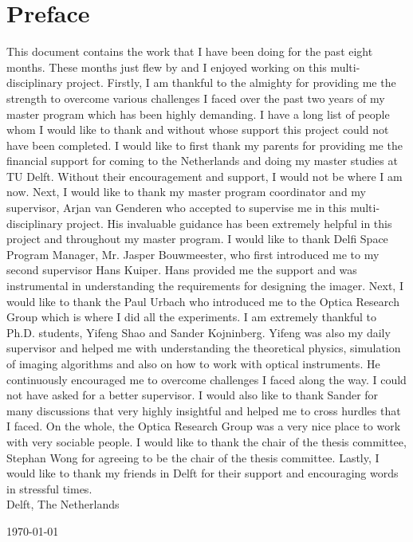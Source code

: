 \chapter*{Preface}
This document contains the work that I have been doing for the past eight months. These months just flew by and I enjoyed working on this multi-disciplinary project. Firstly, I am thankful to the almighty for providing me the strength to overcome various challenges I faced over the past two years of my master program which has been highly demanding. I have a long list of people whom I would like to thank and without whose support this project could not have been completed.
I would like to first thank my parents for providing me the financial support for coming to the Netherlands and doing my master studies at TU Delft. Without their encouragement and support, I would not be where I am now. Next, I would like to thank my master program coordinator and my supervisor, Arjan van Genderen who accepted to supervise me in this multi-disciplinary project. His invaluable guidance has been extremely helpful in this project and throughout my master program. 
I would like to thank Delfi Space Program Manager, Mr. Jasper Bouwmeester, who first introduced me to my second supervisor Hans Kuiper. Hans provided me the support and was instrumental in understanding the requirements for designing the imager. Next, I would like to thank the Paul Urbach who introduced me to the Optica Research Group which is where I did all the experiments. I am extremely thankful to Ph.D. students, Yifeng Shao and Sander Kojninberg. Yifeng was also my daily supervisor and helped me with understanding the theoretical physics, simulation of imaging algorithms and also on how to work with optical instruments. He continuously encouraged me to overcome challenges I faced along the way. I could not have asked for a better supervisor. I would also like to thank Sander for many discussions that very highly insightful and helped me to cross hurdles that I faced. On the whole, the Optica Research Group was a very nice place to work with very sociable people. I would like to thank the chair of the thesis committee, Stephan Wong for agreeing to be the chair of the thesis committee. Lastly, I would like to thank my friends in Delft for their support and encouraging words in stressful times. \\


\noindent
Delft, The Netherlands

\noindent
\today
